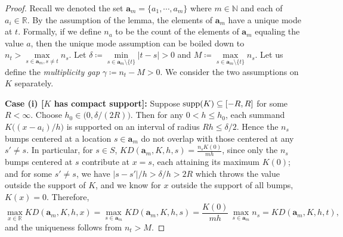 \documentclass[
  12pt]{article}
\newcommand{\R}{\mathbb{R}}
\newcommand{\N}{\mathbb{N}}
\newcommand{\ba}{\boldsymbol{a}}
\begin{document}
\begin{proof}
Recall we denoted the set $\ba_m= \{a_1,\cdots,a_m\}$ where $m \in \N$ and each of $a_i \in \R$. By the assumption of the lemma, the elements of $\ba_m$ have a unique mode at $t$. Formally, if we define $n_a$ to be the count of the elements of $\ba_m$ equaling the value $a$, then the unique mode assumption can be boiled down to $n_t > \underset{s \in \ba_m, s \neq t}{\max}n_s$. Let $\delta\coloneqq\underset{s\in \ba_m\setminus\{t\}}{\min} |t-s|>0$ and $M\coloneqq\underset{s\in \ba_m\setminus\{t\}}{\max} n_s$. Let us define the \emph{multiplicity gap} $\gamma\coloneqq n_t-M>0$. We consider the two assumptions on $K$ separately.

\medskip
\noindent\textbf{Case (i) [$K$ has compact support]:}
Suppose ${\rm supp}(K)\subseteq[-R,R]$ for some $R<\infty$. Choose $h_0\in\bigl(0,\delta/(2R)\bigr)$. Then for any $0<h\le h_0$, each summand $K\bigl((x-a_i)/h\bigr)$ is supported on an interval of radius $Rh\le \delta/2$. Hence the $n_s$ bumps centered at a location $s\in \ba_m$ do not overlap with those centered at any $s'\neq s$. In particular, for $s\in S$, $KD(\ba_m,K,h,s)=\frac{n_s K(0)}{mh}$,
since only the $n_s$ bumps centered at $s$ contribute at $x=s$, each attaining its maximum $K(0)$; and for some $s'\neq s$, we have $|s-s'|/h> \delta/h > 2R$ which throws the value outside the support of $K$, and we know for $x$ outside the support of all bumps, $K(x)=0$. Therefore,
$$
\max_{x\in\mathbb{R}} KD(\ba_m,K,h,x)
= \max_{s\in \ba_m} KD(\ba_m,K,h,s)
= \frac{K(0)}{mh}\,\max_{s\in \ba_m} n_s
= KD(\ba_m,K,h,t),
$$
and the uniqueness follows from $n_t>M$.


\end{proof}
\end{document}
